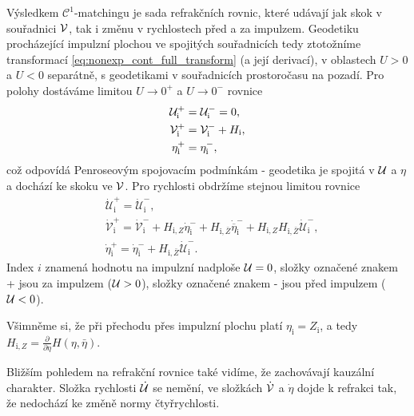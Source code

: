 Výsledkem $\mathcal{C}^1$-matchingu je sada refrakčních rovnic, které udávají jak skok v souřadnici $\mathcal{V}$,
tak i změnu v rychlostech před a za impulzem. Geodetiku procházející impulzní plochou ve spojitých souřadnicích tedy
ztotožníme transformací \eqref{eq:nonexp_cont_full_transform} (a její derivací), v oblastech $U > 0$ a $U < 0$ separátně, s geodetikami v souřadnicích prostoročasu na pozadí.
Pro polohy dostáváme limitou $U \to 0^+$ a $U \to 0^-$ rovnice
\begin{equation}
    \label{eq:refraction_nonexpanding_positions}
    \begin{split}
        \mathcal{U}^{+}_{\mathrm{i}} &= \mathcal{U}^{-}_{\mathrm{i}} = 0,\\
        \mathcal{V}^{+}_{\mathrm{i}} &= \mathcal{V}^{-}_{\mathrm{i}} + H_{\mathrm{i}},\\
        \eta^{+}_{\mathrm{i}} &= \eta^{-}_{\mathrm{i}},
    \end{split}
\end{equation}
což odpovídá Penroseovým spojovacím podmínkám - geodetika je spojitá v $\mathcal{U}$ a $\eta$ a dochází ke skoku ve $\mathcal{V}$.
Pro rychlosti obdržíme stejnou limitou rovnice
\begin{equation}
    \label{eq:refraction_nonexpanding_velocities}
    \begin{split}
        &\dot{\mathcal{U}}^{+}_{\mathrm{i}} = \dot{\mathcal{U}}^{-}_{\mathrm{i}},\\
        &\dot{\mathcal{V}}^{+}_{\mathrm{i}} = \dot{\mathcal{V}}_{\mathrm{i}}^{-} + H_{\mathrm{i}, Z}
        \dot{\eta}^{-}_{\mathrm{i}} + H_{\mathrm{i}, \bar{Z}} \dot{\overline{\eta}}^{-}_{\mathrm{i}} + 
        H_{\mathrm{i}, Z} H_{\mathrm{i}, \bar{Z}} \dot{\mathcal{U}}_{\mathrm{i}}^{-},\\
        &\dot{\eta}_{\mathrm{i}}^{+} =\dot{\eta}_{\mathrm{i}}^{-}+H_{\mathrm{i}, \bar{Z}}
        \dot{\mathcal{U}}_{\mathrm{i}}^{-}.
    \end{split}
\end{equation}
Index $i$ znamená hodnotu na impulzní nadploše $\mathcal{U} = 0$, složky označené znakem + jsou za impulzem ($\mathcal{U} > 0$),
složky označené znakem - jsou před impulzem ($\mathcal{U} <0$).

Všimněme si, že při přechodu přes impulzní plochu platí $\eta_{\mathrm{i}} = Z_{\mathrm{i}}$, a tedy $ H_{\mathrm{i},Z} = \frac{\partial}{\partial \eta} H(\eta, \bar{\eta})$.

Bližším pohledem na refrakční rovnice také vidíme, že zachovávají kauzální charakter. Složka rychlosti $\dot {\mathcal{U}}$ se
nemění, ve složkách $\dot {\mathcal{V}}$ a $\dot \eta$ dojde k refrakci tak, že nedochází ke změně normy čtyřrychlosti.

